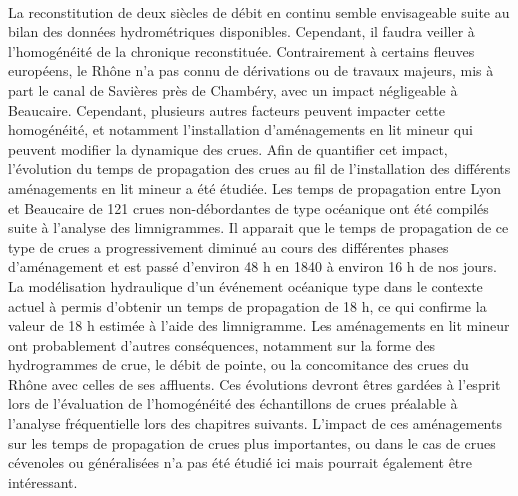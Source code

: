 	\paragraph{} La reconstitution de deux siècles de débit en continu semble envisageable suite au bilan des données hydrométriques disponibles. Cependant, il faudra veiller à l'homogénéité de la chronique reconstituée. Contrairement à certains fleuves européens, le Rhône n'a pas connu de dérivations ou de travaux majeurs, mis à part le canal de Savières près de Chambéry, avec un impact négligeable à Beaucaire. Cependant, plusieurs autres facteurs peuvent impacter cette homogénéité, et notamment l'installation d'aménagements en lit mineur qui peuvent modifier la dynamique des crues. Afin de quantifier cet impact, l'évolution du temps de propagation des crues au fil de l'installation des différents aménagements en lit mineur a été étudiée. Les temps de propagation entre Lyon et Beaucaire de 121 crues non-débordantes de type océanique ont été compilés suite à l'analyse des limnigrammes. Il apparait que le temps de propagation de ce type de crues a progressivement diminué au cours des différentes phases d'aménagement et est passé d'environ 48 h en 1840 à environ 16 h de nos jours. La modélisation hydraulique d'un événement océanique type dans le contexte actuel à permis d'obtenir un temps de propagation de 18 h, ce qui confirme la valeur de 18 h estimée à l'aide des limnigramme. Les aménagements en lit mineur ont probablement d'autres conséquences, notamment sur la forme des hydrogrammes de crue, le débit de pointe, ou la concomitance des crues du Rhône avec celles de ses affluents. Ces évolutions devront êtres gardées à l'esprit lors de l'évaluation de l'homogénéité des échantillons de crues préalable à l'analyse fréquentielle lors des chapitres suivants. L'impact de ces aménagements sur les temps de propagation de crues plus importantes, ou dans le cas de crues cévenoles ou généralisées n'a pas été étudié ici mais pourrait également être intéressant.
	

